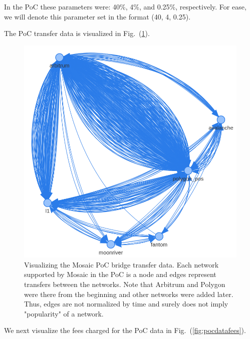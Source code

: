 In the PoC these parameters were: 40\%, 4\%, and 0.25\%, respectively. For ease, we will denote this parameter set in the format (40, 4, 0.25).

The PoC transfer data is visualized in Fig.~(\ref{fig:pocdatavis}).
%
\begin{figure}
    \centering
    \includegraphics[scale=0.28]{images/mosaic/pocdata.png}
    \caption{Visualizing the Mosaic PoC bridge transfer data. Each network supported by Mosaic in the PoC is a node and edges represent transfers between the networks. Note that Arbitrum and Polygon were there from the beginning and other networks were added later. Thus, edges are not normalized by time and surely does not imply "popularity" of a network.}
    \label{fig:pocdatavis}
\end{figure}
%
We next visualize the fees charged for the PoC data in Fig.~(\ref{fig:pocdatafees}).
%
